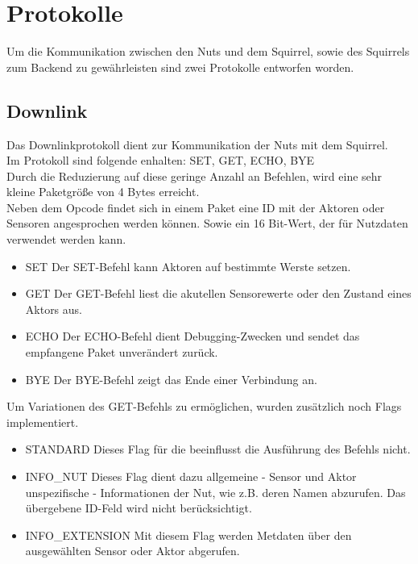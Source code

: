 \documentclass[12pt,a4paper]{article}
\begin{document}
\section{Protokolle}
Um die Kommunikation zwischen den Nuts und dem Squirrel, sowie des Squirrels zum Backend zu gewährleisten sind zwei Protokolle entworfen worden.
	\subsection{Downlink}  
Das Downlinkprotokoll dient zur Kommunikation der Nuts mit dem Squirrel.\\
Im Protokoll sind folgende enhalten: SET, GET, ECHO, BYE\\
Durch die Reduzierung auf diese geringe Anzahl an Befehlen, wird eine sehr kleine Paketgröße von 4 Bytes erreicht.\\
Neben dem Opcode findet sich in einem Paket eine ID mit der Aktoren oder Sensoren angesprochen werden können. Sowie ein 16 Bit-Wert, der für Nutzdaten verwendet werden kann.\\
\begin{itemize}
	\item{SET}
Der SET-Befehl kann Aktoren auf bestimmte Werste setzen.
	\item{GET}
Der GET-Befehl liest die akutellen Sensorewerte oder den Zustand eines Aktors aus.
	\item{ECHO}
Der ECHO-Befehl dient Debugging-Zwecken und sendet das empfangene Paket unverändert zurück.
	\item{BYE}
Der BYE-Befehl zeigt das Ende einer Verbindung an.
\end{itemize}
Um Variationen des GET-Befehls zu ermöglichen, wurden zusätzlich noch Flags implementiert.\\
\begin{itemize}
	\item{STANDARD}
Dieses Flag für die beeinflusst die Ausführung des Befehls nicht.
	\item{INFO\_NUT}
Dieses Flag dient dazu allgemeine - Sensor und Aktor unspezifische - Informationen der Nut, wie z.B. deren Namen abzurufen. Das übergebene ID-Feld wird nicht berücksichtigt.\\
	\item{INFO\_EXTENSION}
Mit diesem Flag werden Metdaten über den ausgewählten Sensor oder Aktor abgerufen.
\end{itemize}
\end{document}
